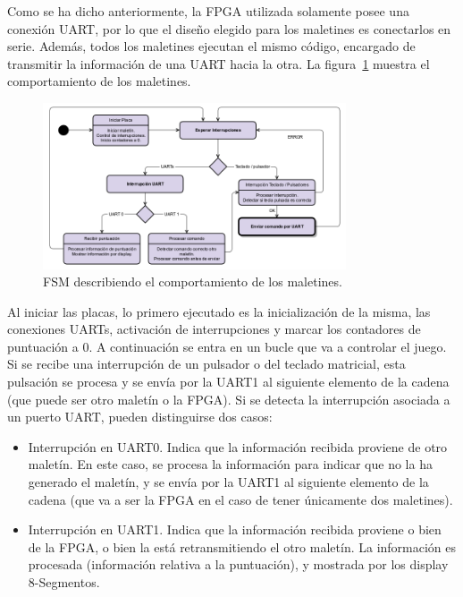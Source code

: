 Como se ha dicho anteriormente, la FPGA utilizada solamente posee una
conexión UART, por lo que el diseño elegido para los maletines es
conectarlos en serie. Además, todos los maletines ejecutan el mismo código,
encargado de transmitir la información de una UART hacia la otra. La
figura~\ref{s3:fig:FSM_maletin} muestra el comportamiento de los maletines.




\begin{figure}[h]
  \centering
  \includegraphics[width=0.8\textwidth]{images/maletin_fsm.png}
  \caption{FSM describiendo el comportamiento de los maletines.}
  \label{s3:fig:FSM_maletin}
\end{figure}


Al iniciar las placas, lo primero ejecutado es la inicialización de la
misma, las conexiones UARTs, activación de interrupciones y marcar los
contadores de puntuación a 0. A continuación se entra en un bucle que va a
controlar el juego. Si se recibe una interrupción de un pulsador o del
teclado matricial, esta pulsación se procesa y se envía por la UART1 al
siguiente elemento de la cadena (que puede ser otro maletín o la FPGA). Si
se detecta la interrupción asociada a un puerto UART, pueden distinguirse
dos casos:
\begin{itemize}
\item Interrupción en UART0. Indica que la información recibida proviene de
  otro maletín. En este caso, se procesa la información para indicar que no
  la ha generado el maletín, y se envía por la UART1 al siguiente elemento
  de la cadena (que va a ser la FPGA en el caso de tener únicamente dos
  maletines).
\item Interrupción en UART1. Indica que la información recibida proviene o
  bien de la FPGA, o bien la está retransmitiendo el otro maletín. La
  información es procesada (información relativa a la puntuación), y
  mostrada por los display 8-Segmentos.
\end{itemize}




%
%


